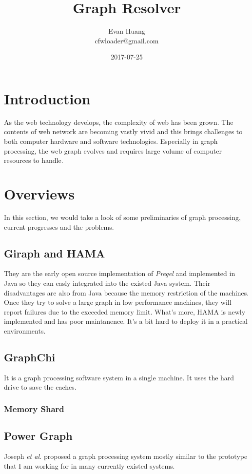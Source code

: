 \documentclass{article}
\title{Graph Resolver}
\date{2017-07-25}
\author{Evan Huang \\ cfwloader@gmail.com}
\begin{document}
	\maketitle

	\newpage

	\tableofcontents


	\newpage

	\section{Introduction}
	As the web technology develops, the complexity of web has been grown. The contents of web network are becoming vastly vivid and this brings challenges to both computer hardware and software technologies. Especially in graph processing, the web graph evolves and requires large volume of computer resources to handle.

	\section{Overviews}
	In this section, we would take a look of some preliminaries of graph processing, current progresses and the problems.
	\subsection{Giraph and HAMA}
	They\cite{seo2010hama:}\cite{giraph} are the early open source implementation of \emph{Pregel}\cite{malewicz2009pregel:} and implemented in Java so they can easly integrated into the existed Java system. Their disadvantages are also from Java because the memory restriction of the machines. Once they try to solve a large graph in low performance machines, they will report failures due to the exceeded memory limit.
	\newline
	What's more, HAMA is newly implemented and has poor maintanence. It's a bit hard to deploy it in a practical environments.
	\subsection{GraphChi}
	It\cite{kyrola2012graphchi:} is a graph processing software system in a single machine. It uses the hard drive to save the caches.
	\subsubsection{Memory Shard}
	\subsection{Power Graph}
	Joseph \emph{et al.}\cite{gonzalez2012powergraph:} proposed a graph processing system mostly similar to the prototype that I am working for in many currently existed systems.
\end{document}
